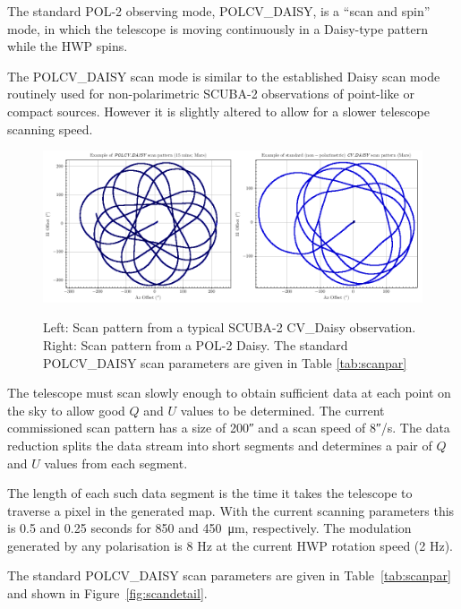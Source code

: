 The standard POL-2 observing mode, POLCV\_DAISY, is a “scan and spin”
mode, in which the telescope is moving continuously in a Daisy-type
pattern while the HWP spins.

The POLCV\_DAISY scan mode is similar to the established Daisy scan
mode routinely used for non-polarimetric SCUBA-2 observations of
point-like or compact sources. However it is slightly altered to allow
for a slower telescope scanning speed.


\begin{figure}[t!]
\begin{center}
\includegraphics[width=0.9\linewidth]{scan_pattern_daisy_comparison.png}
\label{fig:scancompsrison}
\caption [Scan Pattern Comparison]{Left: Scan pattern from a typical
  SCUBA-2 CV\_Daisy observation. Right: Scan pattern from a POL-2
  Daisy. The standard POLCV\_DAISY scan parameters are given in Table
  \ref{tab:scanpar} }
\end{center}
\end{figure}


The telescope must scan slowly enough to obtain sufficient data at
each point on the sky to allow good $Q$ and $U$ values to be
determined. The current commissioned scan pattern has a size of
200\si{\arcsecond} and a scan speed of 8\si{\arcsecond}/s. The data
reduction splits the data stream into short segments and determines a
pair of $Q$ and $U$ values from each segment.

The length of each such data segment is the time it takes the
telescope to traverse a pixel in the generated map. With the current
scanning parameters this is 0.5 and 0.25 seconds for 850 and
\SI{450}{\micro\metre}, respectively. The modulation generated by any
polarisation is 8 Hz at the current HWP rotation speed (2 Hz).

The standard POLCV\_DAISY scan parameters are given in
Table~\ref{tab:scanpar} and shown in Figure~\ref{fig:scandetail}.

